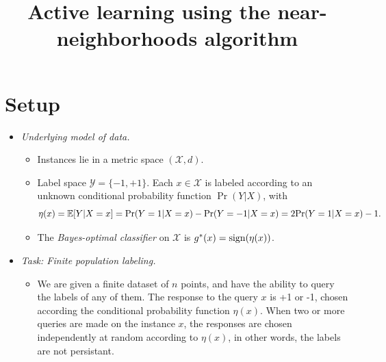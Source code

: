 \documentclass{article}
\title{Active learning using the near-neighborhoods algorithm}
\def\pr{{\rm Pr}}
\def\E{{\mathbb E}}
\def\X{{\mathcal X}}
\def\Y{{\mathcal Y}}
\def\sign{{\rm sign}}
\begin{document}
\maketitle

\section{Setup}

\begin{itemize}
\item {\it Underlying model of data.}

\begin{itemize}
\item Instances lie in a metric space $(\X, d)$. 
\item Label space $\Y = \{-1,+1\}$. Each $x \in \X$ is labeled according to an unknown conditional probability function $\Pr(Y|X)$, with
$$ \eta(x) = \E[Y | X=x] = \pr(Y=1|X=x) - \pr(Y=-1|X=x) = 2 \pr(Y=1|X=x) - 1 .$$
\item The {\it Bayes-optimal classifier} on $\X$ is $g^*(x) = \sign(\eta(x))$.
\end{itemize}

\item {\it Task: Finite population labeling.}

\begin{itemize}
\item We are given a finite dataset of $n$ points, and have the
  ability to query the labels of any of them. The response to the
  query $x$ is +1 or -1, chosen according the conditional probability
  function $\eta(x)$. When two or more queries are made on the
  instance $x$, the responses are chosen independently at random
  according to $\eta(x)$, in other words, the labels are not persistant. 


\end{itemize}
\end{itemize}
\end{document}
